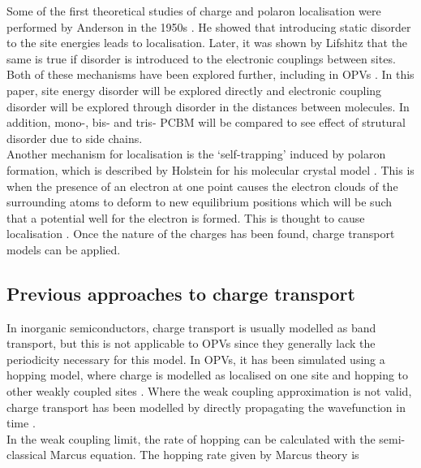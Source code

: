 \documentclass[a4paper,12pt]{article}
\begin{document}
\noindent Some of the first theoretical studies of charge and polaron localisation were performed by Anderson in the 1950s \cite{Anderson1956}. He showed that introducing static disorder to the site energies leads to localisation. Later, it was shown by Lifshitz \cite{Lifshitz} that the same is true if disorder is introduced to the electronic couplings between sites. Both of these mechanisms have been explored further, including in OPVs \cite{CTDisordered} \cite{Fishchuk2003} \cite{Frost2010} \cite{Troisi2006} \cite{Grozema2002}. In this paper, site energy disorder will be explored directly and electronic coupling disorder will be explored through disorder in the distances between molecules. In addition, mono-, bis- and tris- PCBM will be compared to see effect of strutural disorder due to side chains.\\ 

\noindent Another mechanism for localisation is the `self-trapping' induced by polaron formation, which is described by Holstein for his molecular crystal model \cite{Molecular-crystal1959}. This is when the presence of an electron at one point causes the electron clouds of the surrounding atoms to deform to new equilibrium positions which will be such that a potential well for the electron is formed. This is thought to cause localisation \cite{Fehske2006}. Once the nature of the charges has been found, charge transport models can be applied. \\

\subsection{Previous approaches to charge transport}

\noindent In inorganic semiconductors, charge transport is usually modelled as band transport, but this is not applicable to OPVs since they generally lack the periodicity necessary for this model. In OPVs, it has been simulated using a hopping model, where charge is modelled as localised on one site and hopping to other weakly coupled sites \cite{Nelson2009} \cite{Frost2006} \cite{Fishchuk2003}. Where the weak coupling approximation is not valid, charge transport has been modelled by directly propagating the wavefunction in time \cite{Prins2006} \cite{Grozema2002}.\\ 

\noindent In the weak coupling limit, the rate of hopping can be calculated with the semi-classical Marcus equation. The hopping rate given by Marcus theory is \cite{Marcus1956} 
\end{document}
